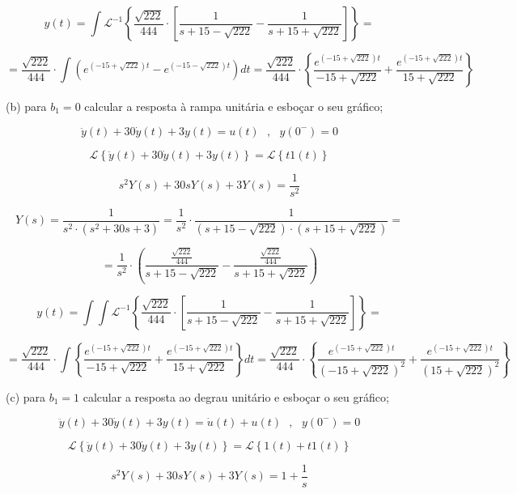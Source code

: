 \documentclass{article}
\begin{document}
\[ y(t) = \int \mathcal{L}^{-1} \left\{\frac{\sqrt{222}}{444} \cdot \left[ \frac{1}{s + 15 - \sqrt{222}} - \frac{1}{s + 15 + \sqrt{222}} \right] \right\} = \]

\[ = \frac{\sqrt{222}}{444} \cdot \int (e^{(-15+\sqrt{222})t} - e^{(-15-\sqrt{222})t}) dt = \frac{\sqrt{222}}{444} \cdot \left\{ \frac{e^{(-15+\sqrt{222})t}}{-15+\sqrt{222}} + \frac{e^{(-15+\sqrt{222})t}}{15+\sqrt{222}} \right\}  \]

\vspace{\baselineskip}

(b) para $b_1 = 0$ calcular a resposta à rampa unitária e esboçar o seu gráfico;

\vspace{\baselineskip}

\[\ddot{y}(t) + 30\dot{y}(t) + 3y(t) = u(t)\,\,\,\,,\,\,\,\,y(0^{-}) = 0\]

\[\mathcal{L} \left\{\ddot{y}(t) + 30\dot{y}(t) + 3y(t)\right\} = \mathcal{L} \left\{t1(t)\right\}\]

\[ s^{2}Y(s) + 30sY(s) + 3Y(s) = \frac{1}{s^{2}} \]

\[ Y(s) = \frac{1}{s^{2} \cdot (s^{2} + 30s + 3)} = \frac{1}{s^{2}} \cdot \frac{1}{(s + 15 - \sqrt{222}) \cdot (s + 15 + \sqrt{222})} =\]

\[ = \frac{1}{s^{2}} \cdot \left(\frac{ \frac{\sqrt{222}}{444}}{s + 15 - \sqrt{222}} - \frac{\frac{\sqrt{222}}{444}}{s + 15 + \sqrt{222}}\right) \]

\[ y(t) = \int \int \mathcal{L}^{-1} \left\{\frac{\sqrt{222}}{444} \cdot \left[ \frac{1}{s + 15 - \sqrt{222}} - \frac{1}{s + 15 + \sqrt{222}} \right] \right\} = \]

\[ = \frac{\sqrt{222}}{444} \cdot \int \left\{ \frac{e^{(-15+\sqrt{222})t}}{-15+\sqrt{222}} + \frac{e^{(-15+\sqrt{222})t}}{15+\sqrt{222}} \right\} dt = \frac{\sqrt{222}}{444} \cdot \left\{ \frac{e^{(-15+\sqrt{222})t}}{(-15+\sqrt{222})^{2}} + \frac{e^{(-15+\sqrt{222})t}}{(15+\sqrt{222})^{2}} \right\} \]

\vspace{\baselineskip}

(c) para $b_1 = 1$ calcular a resposta ao degrau unitário e esboçar o seu gráfico;

\[\ddot{y}(t) + 30\dot{y}(t) + 3y(t) = \dot{u}(t) + u(t)\,\,\,\,,\,\,\,\,y(0^{-}) = 0\]

\[\mathcal{L} \left\{\ddot{y}(t) + 30\dot{y}(t) + 3y(t)\right\} = \mathcal{L} \left\{1(t) + t1(t)\right\}\]

\[ s^{2}Y(s) + 30sY(s) + 3Y(s) = 1 + \frac{1}{s} \]
\end{document}
